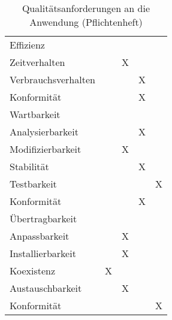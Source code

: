 \begin{table}[H]
\begin{tabular}{lcccc}
		\rowcolor{MidnightBlue!15}
		Effizienz	 						&					&				&					&							\\
		\hspace{1.5em} Zeitverhalten		&					&	X			& 					&							\\
		\hspace{1.5em} Verbrauchsverhalten	&					&				& X					&							\\		
		\hspace{1.5em} Konformität			&					&				& X					&							\\
		
		\rowcolor{MidnightBlue!15}
		Wartbarkeit 						&					&				&					&							\\
		\hspace{1.5em} Analysierbarkeit		&					&				& X					&							\\
		\hspace{1.5em} Modifizierbarkeit	&					&	X			& 					&							\\
		\hspace{1.5em} Stabilität			&					&				& X					&							\\
		\hspace{1.5em} Testbarkeit			&					&				& 					&	X						\\		
		\hspace{1.5em} Konformität			&					&				& X					&							\\
		
		\rowcolor{MidnightBlue!15}
		Übertragbarkeit 					&					&				&					&							\\
		\hspace{1.5em} Anpassbarkeit		&					&	X			& 					&							\\
		\hspace{1.5em} Installierbarkeit	&					&	X			& 					&							\\
		\hspace{1.5em} Koexistenz			&	X				&				& 					&							\\
		\hspace{1.5em} Austauschbarkeit		&					&	X			& 					&							\\		
		\hspace{1.5em} Konformität			&					&				& 					&	X						\\
		
	
	\end{tabular}
	\caption{Qualitätsanforderungen an die Anwendung (Pflichtenheft)}
	\label{tab:qualitaetsanforderungen}
\end{table}